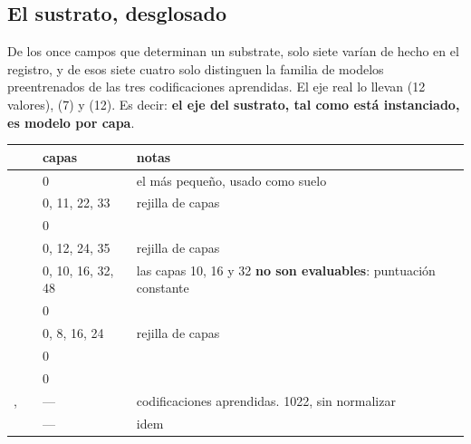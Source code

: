 \subsection{El sustrato, desglosado}

De los once campos que determinan un substrate, solo siete varían de hecho en el
registro, y de esos siete cuatro solo distinguen la familia de modelos
preentrenados de las tres codificaciones aprendidas. El eje real lo llevan
 (12 valores),  (7) y  (12). Es decir: \textbf{el eje del sustrato, tal
como está instanciado, es modelo por capa}.

\begin{center}
\small
\begin{tabularx}{\linewidth}{@{}L{5.3cm} L{2.8cm} L{2.4cm} X@{}}
\toprule
{} &  & capas & notas\\
\midrule
{}   &     & 0 & el más pequeño, usado como suelo\\
&     & 0, 11, 22, 33 & rejilla de capas\\
  &     & 0 & \\
                     &   & 0, 12, 24, 35 & rejilla de capas\\
          &    & 0, 10, 16, 32, 48 & las capas 10, 16 y 32 \textbf{no son evaluables}: puntuación constante\\
         &    & 0 & \\
     &      & 0, 8, 16, 24 & rejilla de capas\\
                &      & 0 & \\
        &  & 0 & \\
, &  & --- & codificaciones aprendidas.  1022, sin normalizar\\
                  &  & --- & idem\\
\bottomrule
\end{tabularx}
\label{tab:sustrato}
\end{center}

